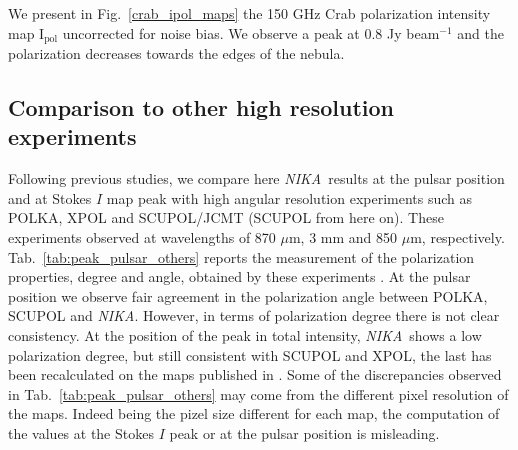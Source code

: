 \documentclass[twocolumn,traditabstract]{aa}
\def\NIKA{\textit{NIKA}}
\begin{document}
We present in Fig.~\ref{crab_ipol_maps} the 150 GHz Crab polarization intensity
map ${\textrm{I}_{\textrm{pol}}}$ uncorrected for noise bias. We observe a peak at 0.8 Jy beam$^{-1}$ and the polarization
decreases towards the edges of the nebula.

\subsection{Comparison to other high resolution experiments}
Following previous studies, we compare here \NIKA\ results at the pulsar position and at Stokes $I$ map peak with high angular resolution experiments such as POLKA, XPOL and SCUPOL/JCMT (SCUPOL from here on). These experiments observed at wavelengths of 870 $\mu$m, 3 mm and 850 $\mu$m, respectively.
Tab.~\ref{tab:peak_pulsar_others} reports the measurement of the polarization properties, degree and angle, obtained by these experiments \citep{2014PASP..126.1027W}. 
At the pulsar position we observe fair agreement in the polarization angle between POLKA, SCUPOL and \NIKA. However, in terms of polarization degree there is not clear consistency. At the position of the peak in total intensity, \NIKA\ shows a low polarization degree, but still consistent with SCUPOL and XPOL, the last has been recalculated on the maps published in \cite{aumont2010}. Some of the discrepancies observed in Tab.~\ref{tab:peak_pulsar_others} may come from the different pixel resolution of the maps. Indeed being the pizel size different for each map, the computation of the values at the Stokes $I$ peak or at the pulsar position is misleading.
\end{document}

